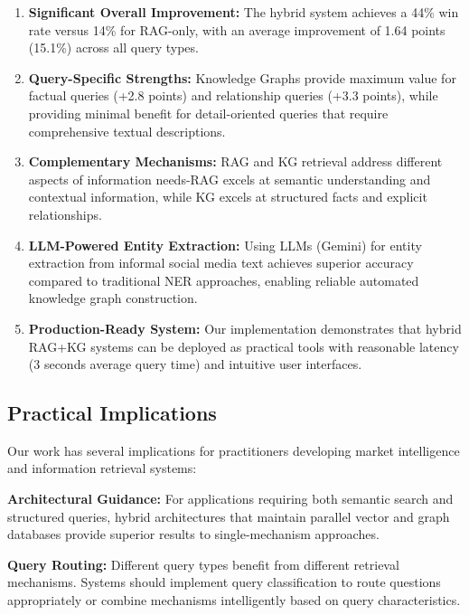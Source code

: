\documentclass[11pt,twocolumn]{article}
\begin{document}
\begin{enumerate}
\item \textbf{Significant Overall Improvement:} The hybrid system achieves a 44\% win rate versus 14\% for RAG-only, with an average improvement of 1.64 points (15.1\%) across all query types.

\item \textbf{Query-Specific Strengths:} Knowledge Graphs provide maximum value for factual queries (+2.8 points) and relationship queries (+3.3 points), while providing minimal benefit for detail-oriented queries that require comprehensive textual descriptions.

\item \textbf{Complementary Mechanisms:} RAG and KG retrieval address different aspects of information needs-RAG excels at semantic understanding and contextual information, while KG excels at structured facts and explicit relationships.

\item \textbf{LLM-Powered Entity Extraction:} Using LLMs (Gemini) for entity extraction from informal social media text achieves superior accuracy compared to traditional NER approaches, enabling reliable automated knowledge graph construction.

\item \textbf{Production-Ready System:} Our implementation demonstrates that hybrid RAG+KG systems can be deployed as practical tools with reasonable latency (3 seconds average query time) and intuitive user interfaces.
\end{enumerate}

\subsection{Practical Implications}

Our work has several implications for practitioners developing market intelligence and information retrieval systems:

\textbf{Architectural Guidance:} For applications requiring both semantic search and structured queries, hybrid architectures that maintain parallel vector and graph databases provide superior results to single-mechanism approaches.

\textbf{Query Routing:} Different query types benefit from different retrieval mechanisms. Systems should implement query classification to route questions appropriately or combine mechanisms intelligently based on query characteristics.
\end{document}
